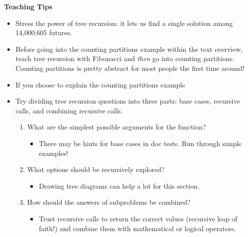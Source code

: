 \begin{guide}
\begin{blocksection}
\textbf{Teaching Tips}
\begin{itemize}
    \item Stress the power of tree recursion: it lets us find a single solution among 14,000,605 futures.
    \item Before going into the counting partitions example within the text overview, teach tree recursion with Fibonacci and \textit{then} go into counting partitions. Counting partitions is pretty abstract for most people the first time around!
    \item If you choose to explain the counting partitions example
    \item Try dividing tree recursion questions into three parts: base cases, recursive calls, and combining recursive calls.
    \begin{enumerate}
        \item What are the simplest possible arguments for the function?
        \begin{itemize}
            \item There may be hints for base cases in doc tests. Run through simple examples!
        \end{itemize}
        \item What options should be recursively explored?
        \begin{itemize}
            \item Drawing tree diagrams can help a lot for this section.
        \end{itemize}
        \item How should the answers of subproblems be combined?
        \begin{itemize}
            \item Trust recursive calls to return the correct values (recursive leap of faith!) and combine them with mathematical or logical operators.
        \end{itemize}
    \end{enumerate}
\end{itemize}
\end{blocksection}
\end{guide}
